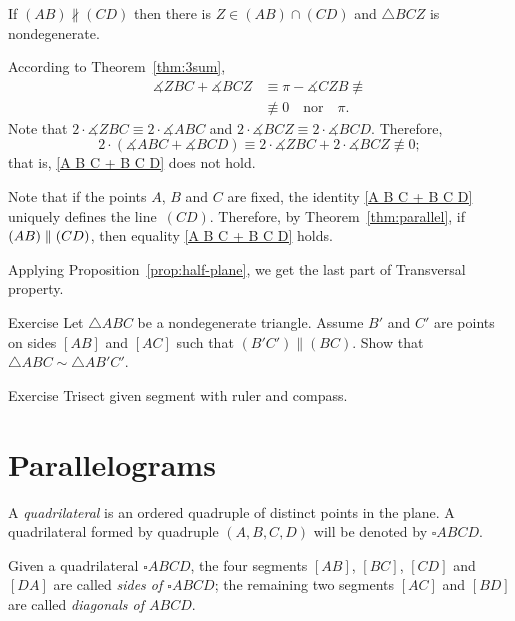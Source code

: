If $(AB)\nparallel(C D)$
then there is $Z\in (AB)\cap(C D)$ 
and $\triangle BCZ$ is nondegenerate.

According to Theorem~\ref{thm:3sum}, 
\begin{align*}
\measuredangle ZBC+\measuredangle BCZ&\equiv \pi-\measuredangle CZB\not\equiv 
\\&\not\equiv 0
\quad
\text{nor}
\quad
\pi.
\end{align*}
Note that $2\cdot\measuredangle Z B C\equiv 2\cdot\measuredangle A B C$ and $2\cdot\measuredangle B C Z\equiv2\cdot\measuredangle B C D$.
Therefore, 
$$2\cdot(\measuredangle A B C+\measuredangle B C D)\equiv 2\cdot\measuredangle Z B C +2\cdot\measuredangle B C Z\not\equiv 0;$$
that is, \ref{A B C + B C D} does not hold.

Note that if the points $A$, $B$ and $C$ are fixed,
the identity \ref{A B C + B C D} uniquely defines the line~$(C D)$.
Therefore, by Theorem~\ref{thm:parallel}, 
if $(AB)\z\parallel(C D)$, then equality \ref{A B C + B C D} holds.

Applying Proposition~\ref{prop:half-plane},
we get the last part of Transversal property.
\qeds


\begin{thm}{Exercise}\label{ex:smililar+parallel}
Let $\triangle ABC$ be a nondegenerate triangle.
Assume $B'$ and $C'$ are points on sides $[AB]$ and $[AC]$ such that $(B'C')\parallel(BC)$.
Show that $\triangle ABC\sim\triangle AB'C'$.
\end{thm}

\begin{thm}{Exercise}\label{ex:trisection}
Trisect given segment with ruler and compass.
\end{thm}





\section*{Parallelograms}

A \emph{quadrilateral} is an ordered quadruple of distinct points in the plane.
A quadrilateral formed by quadruple $(A,B,C,D)$ will be denoted by $\square ABCD$.

Given a quadrilateral $\square ABCD$,
the four segments $[AB]$, $[BC]$, $[CD]$ and $[DA]$ are called \emph{sides of $\square ABCD$};
the remaining two segments $[AC]$ and $[BD]$ are called \emph{diagonals of $ABCD$}.


